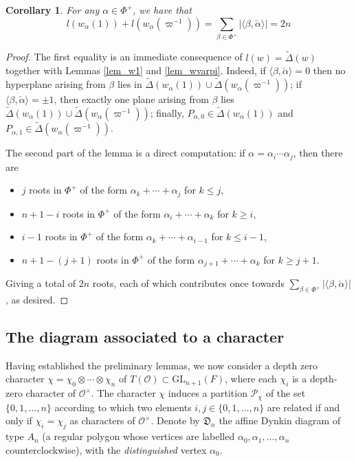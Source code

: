\documentclass{article}
\newcommand{\GL}{\mathrm{GL}}
\newcommand{\calpha}{\check{\alpha}}
\newcommand{\cO}{\mathcal{O}}
\theoremstyle{plain}
\newtheorem{cor}[theorem]{Corollary}
\theoremstyle{definition}
\begin{document}
    \begin{cor}\label{cor_lengthsum}
        For any $\alpha\in\Phi^+$, we have that 
        $$l(w_\alpha(1))+l(w_\alpha(\varpi^{-1}))=\sum_{\beta\in\Phi^+}|\langle\beta,\calpha\rangle|=2n$$
    \end{cor}
    \begin{proof}
        The first equality is an immediate consequence of $l(w)=\widetilde{\Delta}(w)$ together with Lemmas \ref{lem_w1} and \ref{lem_wvarpi}. Indeed, if $\langle\beta,\calpha\rangle=0$ then no hyperplane arising from $\beta$ lies in $\widetilde{\Delta}(w_\alpha(1))\cup\widetilde{\Delta}(w_\alpha(\varpi^{-1}))$; if $\langle\beta,\calpha\rangle=\pm1$, then exactly one plane arising from $\beta$ lies $\widetilde{\Delta}(w_\alpha(1))\cup\widetilde{\Delta}(w_\alpha(\varpi^{-1}))$; finally, $P_{\alpha,0}\in \widetilde{\Delta}(w_\alpha(1))$ and $P_{\alpha,1}\in \widetilde{\Delta}(w_\alpha(\varpi^{-1}))$.

        The second part of the lemma is a direct computation: if $\alpha=\alpha_i\cdots\alpha_j$, then there are 
        \begin{itemize}
            \item $j$ roots in $\Phi^+$ of the form $\alpha_k+\cdots+\alpha_j$ for $k\leq j$,
            \item $n+1-i$ roots in $\Phi^+$ of the form $\alpha_i+\cdots+\alpha_k$ for $k\geq i$,
            \item $i-1$ roots in $\Phi^+$ of the form $\alpha_k+\cdots+\alpha_{i-1}$ for $k\leq i-1$,
            \item $n+1-(j+1)$ roots in $\Phi^+$ of the form $\alpha_{j+1}+\cdots+\alpha_k$ for $k\geq j+1$.
        \end{itemize}
        Giving a total of $2n$ roots, each of which contributes once towards $\sum_{\beta\in\Phi^+}|\langle\beta,\calpha\rangle|$, as desired.
    \end{proof}

    \subsection{The diagram associated to a character}
    Having established the preliminary lemmas, we now consider a depth zero character $\chi=\chi_0\otimes\cdots\otimes\chi_n$ of $T(\cO)\subset\GL_{n+1}(F)$, where each $\chi_i$ is a depth-zero character of $\cO^\times$. The character $\chi$ induces a partition $\mathcal{P}_\chi$ of the set $\{0,1,\ldots,n\}$ according to which two elements $i,j\in\{0,1,\ldots,n\}$ are related if and only if $\chi_i=\chi_j$ as characters of $\cO^\times$. Denote by $\mathfrak{D}_{n}$ the affine Dynkin diagram of type $A_n$ (a regular polygon whose vertices are labelled $\alpha_0,\alpha_1,\ldots,\alpha_n$ counterclockwise), with the \textit{distinguished} vertex $\alpha_0$.
\end{document}
